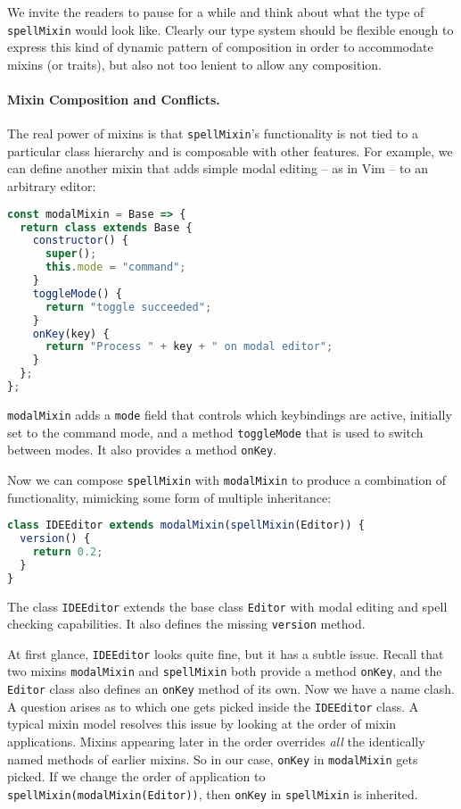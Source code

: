 

We invite the readers to pause for a while and think about what the type of
\lstinline{spellMixin} would look like. Clearly our type system should be
flexible enough to express this kind of dynamic pattern of composition in order
to accommodate mixins (or traits), but also not too lenient to allow any
composition.


\paragraph{Mixin Composition and Conflicts.}
The real power of mixins is that \lstinline{spellMixin}'s functionality is not
tied to a particular class hierarchy and is composable with other features. For
example, we can define another mixin that adds simple modal editing -- as in Vim
-- to an arbitrary editor:
\begin{lstlisting}[language=JavaScript]
const modalMixin = Base => {
  return class extends Base {
    constructor() {
      super();
      this.mode = "command";
    }
    toggleMode() {
      return "toggle succeeded";
    }
    onKey(key) {
      return "Process " + key + " on modal editor";
    }
  };
};
\end{lstlisting}
\lstinline{modalMixin} adds a \lstinline{mode} field that controls which
keybindings are active, initially set to the command mode, and a method
\lstinline{toggleMode} that is used to switch between modes. It also provides a method \lstinline{onKey}.

Now we can compose \lstinline{spellMixin} with \lstinline{modalMixin} to produce
a combination of functionality, mimicking some form of multiple inheritance:
\begin{lstlisting}[language=JavaScript]
class IDEEditor extends modalMixin(spellMixin(Editor)) {
  version() {
    return 0.2;
  }
}
\end{lstlisting}
The class \lstinline{IDEEditor} extends the base class \lstinline{Editor} with
modal editing and spell checking capabilities. It also defines the missing
\lstinline{version} method.

At first glance, \lstinline{IDEEditor} looks quite fine, but it has a subtle
issue. Recall that two mixins \lstinline{modalMixin} and \lstinline{spellMixin}
both provide a method \lstinline{onKey}, and the \lstinline{Editor} class also
defines an \lstinline{onKey} method of its own. Now we have a name clash. A
question arises as to which one gets picked inside the \lstinline{IDEEditor}
class. A typical mixin model resolves this issue by looking at the order of mixin applications. Mixins appearing later in the order
overrides \emph{all} the identically named methods of earlier mixins. So in our
case, \lstinline{onKey} in \lstinline{modalMixin} gets picked. If we
change the order of application to \lstinline{spellMixin(modalMixin(Editor))},
then \lstinline{onKey} in \lstinline{spellMixin} is inherited.

